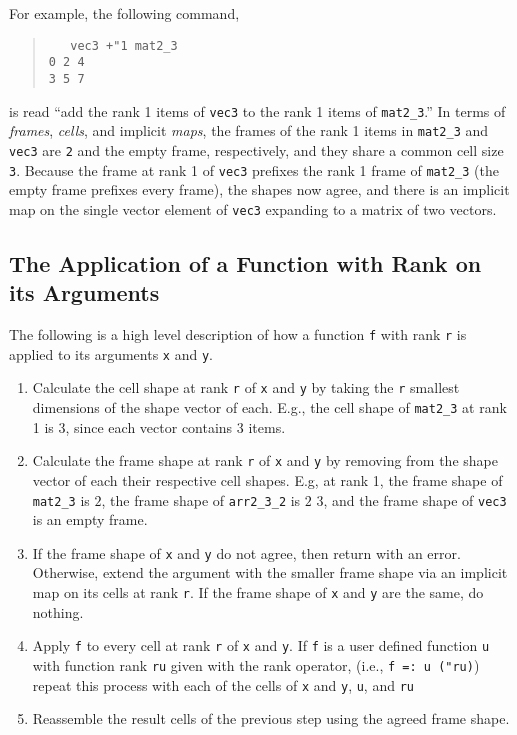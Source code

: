 For example, the following command, 

\begin{quote}
\begin{singlespacing}
\begin{small}
\begin{verbatim}
   vec3 +"1 mat2_3
0 2 4
3 5 7
\end{verbatim}
\end{small}
\end{singlespacing}
\end{quote}

\noindent is read ``add the rank 1 items of \texttt{vec3} to the rank 1 items of \texttt{mat2\_3}.''
In terms of \textit{frames}, \textit{cells}, and implicit \textit{maps}, 
the frames of the rank 1 items in \texttt{mat2\_3} and \texttt{vec3} are \texttt{2} and the empty frame, respectively, 
and they share a common cell size \texttt{3}.
Because the frame at rank 1 of \texttt{vec3} prefixes the rank 1 frame of \texttt{mat2\_3} (the empty frame prefixes every frame), 
the shapes now agree, and there is an implicit map on the single vector element of \texttt{vec3} expanding to a matrix of two vectors.

\subsection{The Application of a Function with Rank on its Arguments}
\label{fridp}
The following is a high level description of how a function \texttt{f} with rank \texttt{r} 
is applied to its arguments \texttt{x} and \texttt{y}\cite{rankanduni}.

\begin{enumerate}
	\item Calculate the cell shape at rank \texttt{r} of \texttt{x} and \texttt{y} 
		by taking the \texttt{r} smallest dimensions of the shape vector of each.
		E.g., the cell shape of \texttt{mat2\_3} at rank 1 is 3, since each vector contains 3 items.
	\item Calculate the frame shape at rank \texttt{r} of \texttt{x} and \texttt{y} 
		by removing from the shape vector of each their respective cell shapes.
		E.g, at rank 1, the frame shape of \texttt{mat2\_3} is $2$,
		the frame shape of \texttt{arr2\_3\_2} is $2$ $3$, 
		and the frame shape of \texttt{vec3} is an empty frame.
	\item If the frame shape of \texttt{x} and \texttt{y} do not agree, then return with an error.
		Otherwise, extend the argument with the smaller frame shape via an implicit map on its cells at rank \texttt{r}.
		If the frame shape of \texttt{x} and \texttt{y} are the same, do nothing.
	\item \label{dataparstep}Apply \texttt{f} to every cell at rank \texttt{r} of \texttt{x} and \texttt{y}.
		If \texttt{f} is a user defined function \texttt{u} with function rank \texttt{ru} given with the rank operator,
		(i.e., \texttt{f =: u ("ru)})
		repeat this process with each of the cells of \texttt{x} and \texttt{y}, \texttt{u}, and \texttt{ru}
	\item Reassemble the result cells of the previous step using the agreed frame shape.
\end{enumerate}

